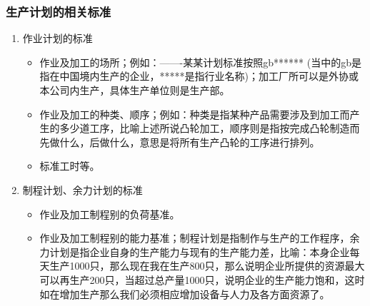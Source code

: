     \subsubsection {生产计划的相关标准}

        \begin{enumerate}
            \item  作业计划的标准
                \begin{itemize}
                    \item  作业及加工的场所；例如：-------某某计划标准按照gb****** (当中的gb是指在中国境内生产的企业，*****是指行业名称)；加工厂所可以是外协或本公司内生产，具体生产单位则是生产部。
                    \item  作业及加工的种类、顺序；例如：种类是指某种产品需要涉及到加工而产生的多少道工序，比喻上述所说凸轮加工，顺序则是指按完成凸轮制造而先做什么，后做什么，意思是将所有生产凸轮的工序进行排列。
                    \item  标准工时等。
                \end{itemize}

            \item  制程计划、余力计划的标准
                \begin{itemize}
                    \item  作业及加工制程别的负荷基准。
                    \item  作业及加工制程别的能力基准；制程计划是指制作与生产的工作程序，余力计划是指企业自身的生产能力与现有的生产能力差，比喻：本身企业每天生产1000只，那么现在我在生产800只，那么说明企业所提供的资源最大可以再生产200只，当超过总产量1000只，说明企业的生产能力饱和，这时如在增加生产那么我们必须相应增加设备与人力及各方面资源了。
                \end{itemize}


\end{enumerate}

